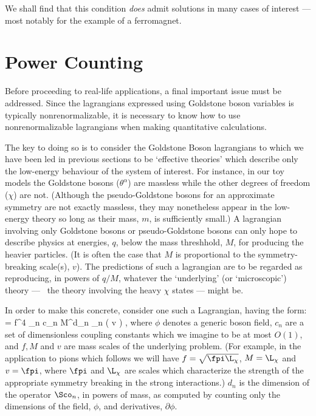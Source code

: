 We shall find that this condition {\em does} admit
solutions in many cases of interest --- most notably for
the example of a ferromagnet.

\section{Power Counting}

Before proceeding to real-life applications, a final
important issue must be addressed.  Since the lagrangians
expressed using Goldstone boson variables is typically
nonrenormalizable, it is necessary to know how to use
nonrenormalizable lagrangians  when making quantitative
calculations. 

The key to doing so is to consider the Goldstone Boson
lagrangians to which we have been led in previous sections
to be `effective theories' which describe only the
low-energy behaviour of the system of interest. For
instance, in our toy models the Goldstone bosons
($\theta^\alpha$) are massless while the other degrees of
freedom ($\chi$) are not. (Although the pseudo-Goldstone
bosons for an approximate symmetry are not exactly
massless, they may nonetheless appear in the low-energy
theory so long as their mass, $m$, is  sufficiently small.)
A lagrangian involving only Goldstone bosons or
pseudo-Goldstone bosons can only hope to describe physics
at energies, $q$, below the mass threshhold, $M$, for
producing the heavier particles. (It is often the case that
$M$  is proportional to the symmetry-breaking scale(s),
$v$). The predictions of such a lagrangian are to be
regarded as reproducing, in powers of $q/M$, whatever the
`underlying' (or `microscopic') theory --- \ie\ the theory
involving the heavy $\chi$ states --- might be.

In order to make this concrete, consider one such a
Lagrangian, having the form:
%
\eq
\label{leffpc}
\leff = f^4 \sum_n {c_n \over M^{d_n}} \; 
\Sco_n \left( {\phi \over v}
\right) ,
\eeq
%
where $\phi$ denotes a generic boson field, $c_n$ are a set
of dimensionless coupling constants which we imagine to be
at most $O(1)$, and $f, M$ and $v$ are mass scales of the
underlying problem. (For example, in the application to
pions which follows we will have $f = \sqrt{\fpi \L_\chi}$,
$M = \L_\chi$ and $v = 
\fpi$, where $\fpi$ and $\L_\chi$ are scales which
characterize the strength of the appropriate symmetry
breaking in the strong interactions.) $d_n$ is the
dimension of the operator $\Sco_n$, in powers of mass, as
computed by counting only the dimensions of the  field,
$\phi$, and derivatives, $\partial\phi$.

